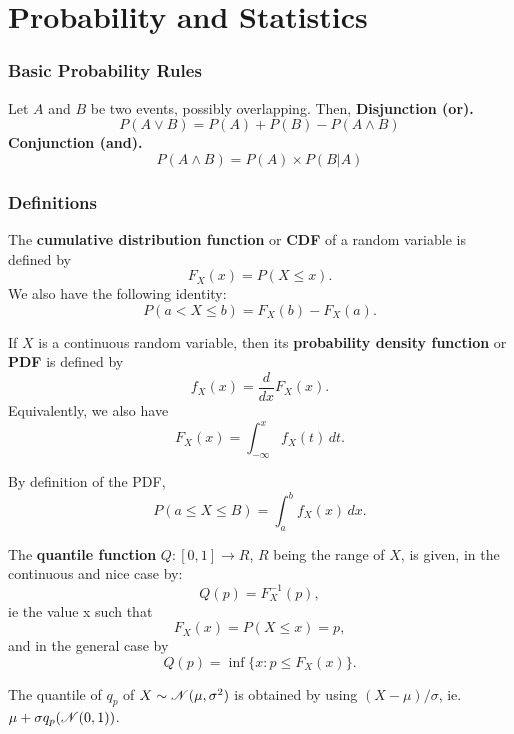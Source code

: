 \part{Probability and Statistics}

\section{Basic Probability Rules}
\begin{outline}
Let $A$ and $B$ be two events, possibly overlapping. Then,
\1 \textbf{Disjunction (or).} 
\begin{equation*}
  P(A\vee B) = P(A) + P(B) - P(A \wedge B)
\end{equation*}
\1 \textbf{Conjunction (and).}
\begin{equation*}
  P(A\wedge B) = P(A)\times P(B|A)
\end{equation*}
\end{outline}

\section{Definitions}
\begin{outline}
\1 The \textbf{cumulative distribution function} or \textbf{CDF} of a random variable is
defined by
\begin{equation*}
  F_X(x) = P(X\leq x).
\end{equation*}
We also have the following identity:
\begin{equation*}
  P(a<X\leq b) = F_X(b) - F_X(a).
\end{equation*}

\1 If $X$ is a continuous random variable, then its \textbf{probability density function}
or \textbf{PDF} is defined by
\begin{equation*}
  f_X(x) = \frac{d}{dx}F_X(x).
\end{equation*}
Equivalently, we also have
\begin{equation*}
  F_X(x) = \int_{-\infty}^x f_X(t)\,dt.
\end{equation*}

\1 By definition of the PDF, 
\begin{equation*}
  P(a\leq X\leq B) = \int_{a}^bf_X(x)\,dx.
\end{equation*}

\1 The \textbf{quantile function} $Q:[0,1]\to R$, $R$ being the range of $X$, is given, in
the continuous and nice case by:
\begin{equation*}
  Q(p) = F_X^{-1}(p),
\end{equation*}
ie the value x such that 
\begin{equation*}
  F_X(x) = P(X\leq x) = p,
\end{equation*}
and in the general case by
\begin{equation*}
  Q(p) = \inf\{x: p\leq F_X(x)\}.
\end{equation*}

\1 The quantile of $q_p$ of $X\sim\mathscr{N}(\mu,\sigma^2)$ is obtained by using
$(X-\mu)/\sigma$, ie. $\mu + \sigma q_p(\mathscr{N}(0,1))$.

\end{outline}

